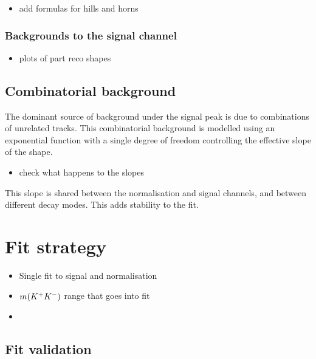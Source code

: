 {\color{Red}
\begin{itemize}
\item add formulas for hills and horns
\end{itemize}
}



\subsubsection{Backgrounds to the signal channel}

{\color{Red}
\begin{itemize}
\item plots of part reco shapes
\end{itemize}
}

\subsection{Combinatorial  background}
\label{sec:B2DsKK_combcomps}

The dominant source of background under the signal peak is due to combinations of unrelated tracks. This combinatorial background is modelled using an exponential function with a single degree of freedom controlling the effective slope of the shape. 

{\color{Red}
\begin{itemize}
\item check what happens to the slopes
\end{itemize}
}
This slope is shared between the normalisation and signal channels, and between different \Dsp decay modes. This adds stability to the fit.


\section{Fit strategy}
\label{sec:B2DsKK_fitstrategy}

{\color{Red}
\begin{itemize}
\item Single fit to signal and normalisation
\item $m({{K}^+}{{K}^-})$ range that goes into fit
\item 
\end{itemize}
}



\subsection{Fit validation}
\label{sec:B2DsKK_fitvalidation}

